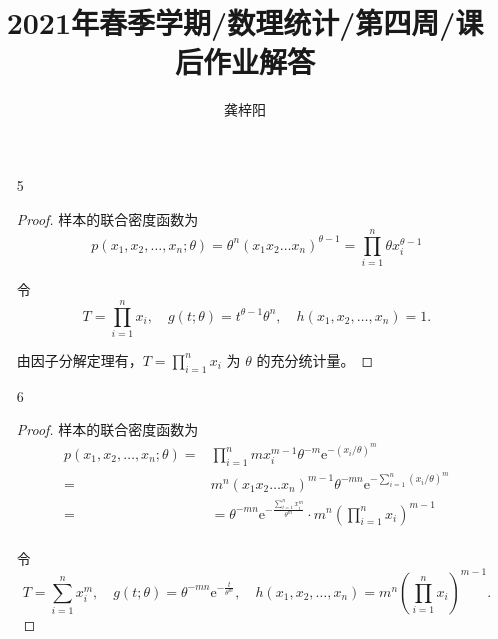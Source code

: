 \documentclass[normal,founder,mtpro2,cn]{elegantnote}
\title{2021年春季学期/数理统计/第四周/课后作业解答}
\author{龚梓阳}
\date{\zhtoday}
\begin{document}
\maketitle
\begin{enumerate}
    \item[5]
        \begin{proof}
            样本的联合密度函数为
            \begin{equation*}
                p\left(x_{1},x_{2},\ldots,x_{n};\theta\right)=\theta^{n}\left(x_{1}x_{2}\ldots x_{n}\right)^{\theta-1}=\prod_{i=1}^{n}\theta x_{i}^{\theta-1}
            \end{equation*}

            令
            \begin{equation*}
                T=\prod_{i=1}^{n}x_{i},\quad g\left(t;\theta\right)=t^{\theta-1}\theta^{n},\quad h\left(x_{1},x_{2},\ldots,x_{n}\right)=1.
            \end{equation*}

            由因子分解定理有，$T=\prod_{i=1}^{n}x_{i}$ 为 $\theta$ 的充分统计量。
        \end{proof}
    \item[6]
        \begin{proof}
            样本的联合密度函数为
            \begin{equation*}
                \begin{aligned}
                    p\left(x_{1},x_{2},\ldots,x_{n};\theta\right)= & \prod_{i=1}^{n}mx_{i}^{m-1}\theta^{-m}\mathrm{e}^{-\left(x_{i}/\theta\right)^{m}}                                       \\
                    =                                              & m^{n}\left(x_{1} x_{2}\ldots x_{n}\right)^{m-1}\theta^{-mn}\mathrm{e}^{-\sum_{i=1}^{n}\left(x_{i}/\theta\right)^{m}}    \\
                    =                                              & =\theta^{-mn}\mathrm{e}^{-\frac{\sum_{i=1}^{n}x_{i}^{m}}{\theta^{m}}}\cdot m^{n}\left(\prod_{i=1}^{n}x_{i}\right)^{m-1} \\
                \end{aligned}
            \end{equation*}

            令
            \begin{equation*}
                T=\sum_{i=1}^{n}x_{i}^{m},\quad g\left(t;\theta\right)=\theta^{-mn}\mathrm{e}^{-\frac{t}{\theta^{m}}},\quad h\left(x_{1},x_{2},\ldots,x_{n}\right)=m^{n}\left(\prod_{i=1}^{n}x_{i}\right)^{m-1}.
            \end{equation*}


\end{proof}
\end{enumerate}
\end{document}
